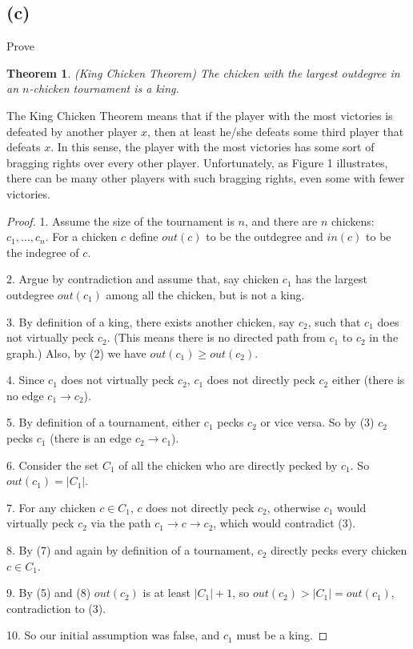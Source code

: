 \documentclass[14pt]{extarticle}
\newtheorem*{thm}{Theorem}
\begin{document}
\subsection{(c)}
Prove
\begin{thm}(King Chicken Theorem) The chicken with the largest outdegree in an $n$-chicken tournament is a king.
\end{thm}

The King Chicken Theorem means that if the player with the most victories is defeated by another player $x$, then at least he/she defeats some third player that defeats $x$. In this sense, the player with the most victories has some sort of bragging rights over every other player. Unfortunately, as Figure 1 illustrates, there can be many other players with such bragging rights, even some with fewer victories.

\begin{proof}
1. Assume the size of the tournament is $n$, and there are $n$ chickens: $c_1, \ldots, c_n$. For a chicken $c$ define $out(c)$ to be the outdegree and $in(c)$ to be the indegree of $c$. 

2. Argue by contradiction and assume that, say chicken $c_1$ has the largest outdegree $out(c_1)$ among all the chicken, but is not a king.

3. By definition of a king, there exists another chicken, say $c_2$, such that $c_1$ does not virtually peck $c_2$. (This means there is no directed path from $c_1$ to $c_2$ in the graph.) Also, by (2) we have $out(c_1) \geq out(c_2)$.

4. Since $c_1$ does not virtually peck $c_2$, $c_1$ does not directly peck $c_2$ either (there is no edge $c_1 \rightarrow c_2$).

5. By definition of a tournament, either $c_1$ pecks $c_2$ or vice versa. So by (3) $c_2$ pecks $c_1$ (there is an edge $c_2 \rightarrow c_1$).

6. Consider the set $C_1$ of all the chicken who are directly pecked by $c_1$. So $out(c_1) = |C_1|$.

7. For any chicken $c \in C_1$, $c$ does not directly peck $c_2$, otherwise $c_1$ would virtually peck $c_2$ via the path $c_1 \rightarrow c \rightarrow c_2$, which would contradict (3).

8. By (7) and again by definition of a tournament, $c_2$ directly pecks every chicken $c \in C_1$.

9. By (5) and (8) $out(c_2)$ is at least $|C_1| + 1$, so $out(c_2) > |C_1| = out(c_1)$, contradiction to (3).

10. So our initial assumption was false, and $c_1$ must be a king.
\end{proof}
\end{document}
